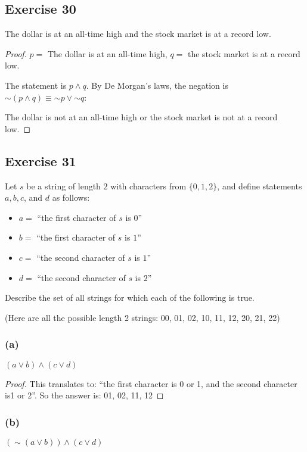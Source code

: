 \documentclass[14pt]{extarticle}
\begin{document}
\subsection{Exercise 30}
The dollar is at an all-time high and the stock market is at a record low.

\begin{proof}
    $p =$ The dollar is at an all-time high, $q =$ the stock market is at a record low.

    The statement is $p \wedge q$. By De Morgan's laws, the negation is $\sim(p \wedge q) \equiv {\sim p} \vee {\sim q}$:

    The dollar is not at an all-time high or the stock market is not at a record low.
\end{proof}

\subsection{Exercise 31}
Let $s$ be a string of length $2$ with characters from $\{0, 1, 2\}$, and define statements $a, b, c$, and $d$ as follows:

\begin{itemize}
    \item $a = $ ``the first character of $s$ is $0$''
    \item $b = $ ``the first character of $s$ is $1$''
    \item $c = $ ``the second character of $s$ is $1$''
    \item $d = $ ``the second character of $s$ is $2$'' \end{itemize}

Describe the set of all strings for which each of the following is true.

(Here are all the possible length 2 strings: 00, 01, 02, 10, 11, 12, 20, 21, 22)

\subsubsection{(a)}
$(a \vee b) \wedge (c \vee d)$

\begin{proof}
    This translates to: ``the first character is 0 or 1, and the second character is1 or 2''. So the answer is: 01, 02, 11, 12
\end{proof}

\subsubsection{(b)}
$({\sim(a \vee b)}) \wedge (c \vee d)$
\end{document}
